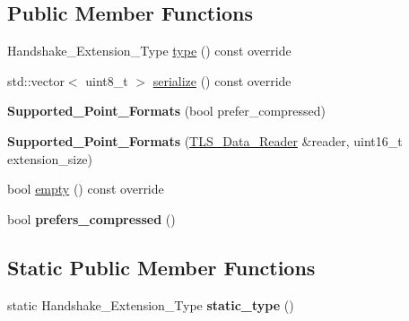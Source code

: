 \subsection*{Public Member Functions}
\begin{DoxyCompactItemize}
\item 
Handshake\+\_\+\+Extension\+\_\+\+Type \mbox{\hyperlink{class_botan_1_1_t_l_s_1_1_supported___point___formats_aeaf44021244451a57f6c257f13aa0a7d}{type}} () const override
\item 
std\+::vector$<$ uint8\+\_\+t $>$ \mbox{\hyperlink{class_botan_1_1_t_l_s_1_1_supported___point___formats_aacbe9742935210838f2e17e0dcecc494}{serialize}} () const override
\item 
\mbox{\label{class_botan_1_1_t_l_s_1_1_supported___point___formats_a36f3871698365322c172f33c545d3c9c}} 
{\bfseries Supported\+\_\+\+Point\+\_\+\+Formats} (bool prefer\+\_\+compressed)
\item 
\mbox{\label{class_botan_1_1_t_l_s_1_1_supported___point___formats_ae30a84f0f9b06c0e8ad7b00f05611f08}} 
{\bfseries Supported\+\_\+\+Point\+\_\+\+Formats} (\mbox{\hyperlink{class_botan_1_1_t_l_s_1_1_t_l_s___data___reader}{T\+L\+S\+\_\+\+Data\+\_\+\+Reader}} \&reader, uint16\+\_\+t extension\+\_\+size)
\item 
bool \mbox{\hyperlink{class_botan_1_1_t_l_s_1_1_supported___point___formats_a66014f1fe0e75931f0c7a682aa9d9083}{empty}} () const override
\item 
\mbox{\label{class_botan_1_1_t_l_s_1_1_supported___point___formats_ab42d3aafcab94b2b4c8a9c1d5ada920f}} 
bool {\bfseries prefers\+\_\+compressed} ()
\end{DoxyCompactItemize}
\subsection*{Static Public Member Functions}
\begin{DoxyCompactItemize}
\item 
\mbox{\label{class_botan_1_1_t_l_s_1_1_supported___point___formats_a6cfd288d6ba096435f7675aa2aa627ce}} 
static Handshake\+\_\+\+Extension\+\_\+\+Type {\bfseries static\+\_\+type} ()
\end{DoxyCompactItemize}


